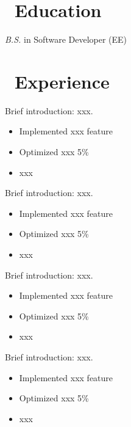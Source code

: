 \documentclass{resume}
\begin{document}



\section{\faGraduationCap\ Education}
\textit{B.S.} in Software Developer (EE)

\section{\faUsers\ Experience}
\role{DevOps}{}
Brief introduction: xxx.
\begin{itemize}
  \item Implemented xxx feature
  \item Optimized xxx 5\%
  \item xxx
\end{itemize}

Brief introduction: xxx.
\begin{itemize}
  \item Implemented xxx feature
  \item Optimized xxx 5\%
  \item xxx
\end{itemize}

Brief introduction: xxx.
\begin{itemize}
  \item Implemented xxx feature
  \item Optimized xxx 5\%
  \item xxx
\end{itemize}

Brief introduction: xxx.
\begin{itemize}
  \item Implemented xxx feature
  \item Optimized xxx 5\%
  \item xxx
\end{itemize}
\end{document}
